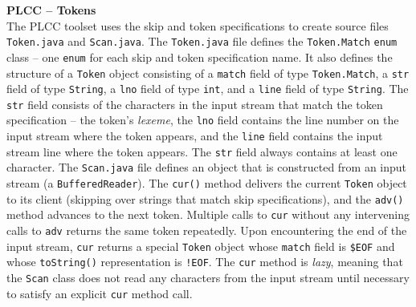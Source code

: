 \begin{minipage}[t]{\sw}
\slidenumber
\LARGE
{\bf PLCC -- Tokens}\\
The PLCC toolset uses the skip and token specifications
to create source files \verb'Token.java' and \verb'Scan.java'.\exx
The \verb'Token.java' file defines the \verb'Token.Match' \verb'enum' class --
one \verb'enum' for each skip and token specification name.
It also defines the structure of a \verb'Token' object
consisting of a \verb'match' field of type \verb'Token.Match',
a \verb'str' field of type \verb'String',
a \verb'lno' field of type \verb'int',
and a \verb'line' field of type \verb'String'.
The \verb'str' field consists of the characters in the input stream
that match the token specification -- the token's {\em lexeme},
the \verb'lno' field contains the line number on the input stream
where the token appears,
and the \verb'line' field contains the input stream line
where the token appears.
The \verb'str' field always contains at least one character.\exx
The \verb'Scan.java' file defines an object
that is constructed from an input stream (a \verb'BufferedReader').
The \verb'cur()' method delivers the current \verb'Token' object to its client
(skipping over strings that match skip specifications),
and the \verb'adv()' method advances to the next token.
Multiple calls to \verb'cur' without any intervening calls to \verb'adv'
returns the same token repeatedly.\exx
Upon encountering the end of the input stream,
\verb'cur' returns a special \verb'Token' object
whose \verb'match' field is \verb'$EOF'
and whose \verb'toString()' representation is \verb'!EOF'.
The \verb'cur' method is {\em lazy},
meaning that the \verb'Scan' class does not read any characters
from the input stream until necessary
to satisfy an explicit \verb'cur' method call.
\end{minipage}
\clearpage
